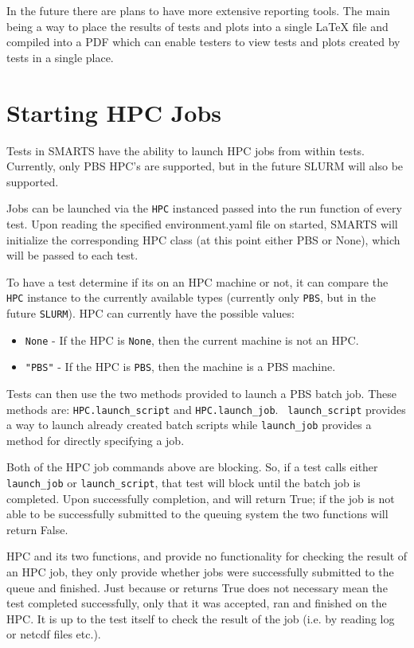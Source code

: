 In the future there are plans to have more extensive reporting tools. The main
being a way to place the results of tests and plots into a single LaTeX file
and compiled into a PDF which can enable testers to view tests and plots created
by tests in a single place.

\section{Starting HPC Jobs}
\label{sec:hpc_jobs}

Tests in SMARTS have the ability to launch HPC jobs from within tests.
Currently, only PBS HPC's are supported, but in the future SLURM will also be
supported.

Jobs can be launched via the {\tt HPC} instanced passed into the run function
of every test. Upon reading the specified environment.yaml file on started,
SMARTS will initialize the corresponding HPC class (at this point either PBS or
None), which will be passed to each test.

To have a test determine if its on an HPC machine or not, it can compare the
{\tt HPC} instance to the currently available types (currently only {\tt PBS},
but in the future {\tt SLURM}). HPC can currently have the possible values:

\begin{itemize}
    \item {\tt None} - If the HPC is {\tt None}, then the current machine is
    not an HPC.
    \item {\tt "PBS"} - If the HPC is {\tt PBS}, then the machine is a PBS
    machine.
\end{itemize}

Tests can then use the two methods provided to launch a PBS batch job. These
methods are: {\tt HPC.launch\_script} and {\tt HPC.launch\_job}. {\tt
launch\_script} provides a way to launch already created batch scripts while
{\tt launch\_job} provides a method for directly specifying a job.

Both of the HPC job commands above are blocking. So, if a test calls either
{\tt launch\_job} or {\tt launch\_script}, that test will block until the batch
job is completed. Upon successfully completion, \launchscript and \launchjob
will return True; if the job is not able to be successfully submitted to the
queuing system the two functions will return False.

HPC and its two functions, \launchscript and \launchjob provide no
functionality for checking the result of an HPC job, they only provide whether
jobs were successfully submitted to the queue and finished. Just because
\launchscript or \launchjob returns True does not necessary mean the test
completed successfully, only that it was accepted, ran and finished on the HPC.
It is up to the test itself to check the result of the job (i.e. by reading log
or netcdf files etc.).

